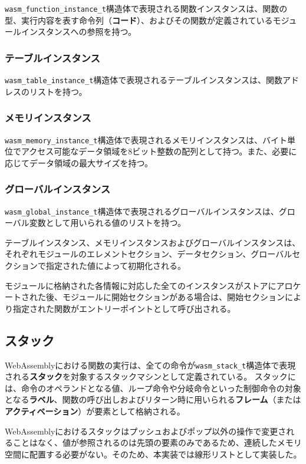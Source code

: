 \verb|wasm_function_instance_t|構造体で表現される関数インスタンスは、関数の型、実行内容を表す命令列（{\bf コード}）、およびその関数が定義されているモジュールインスタンスへの参照を持つ。

\subsubsection{テーブルインスタンス}

\verb|wasm_table_instance_t|構造体で表現されるテーブルインスタンスは、関数アドレスのリストを持つ。

\subsubsection{メモリインスタンス}

\verb|wasm_memory_instance_t|構造体で表現されるメモリインスタンスは、バイト単位でアクセス可能なデータ領域を8ビット整数の配列として持つ。また、必要に応じてデータ領域の最大サイズを持つ。

\subsubsection{グローバルインスタンス}

\verb|wasm_global_instance_t|構造体で表現されるグローバルインスタンスは、グローバル変数として用いられる値のリストを持つ。

テーブルインスタンス、メモリインスタンスおよびグローバルインスタンスは、それぞれモジュールのエレメントセクション、データセクション、グローバルセクションで指定された値によって初期化される。

モジュールに格納された各情報に対応した全てのインスタンスがストアにアロケートされた後、モジュールに開始セクションがある場合は、開始セクションにより指定された関数がエントリーポイントとして呼び出される。

\subsection{スタック}

WebAssemblyにおける関数の実行は、全ての命令が\verb|wasm_stack_t|構造体で表現される{\bf スタック}を対象するスタックマシンとして定義されている。
スタックには、命令のオペランドとなる値、ループ命令や分岐命令といった制御命令の対象となる{\bf ラベル}、関数の呼び出しおよびリターン時に用いられる{\bf フレーム}（または{\bf アクティベーション}）が要素として格納される。

WebAssemblyにおけるスタックはプッシュおよびポップ以外の操作で変更されることはなく、値が参照されるのは先頭の要素のみであるため、連続したメモリ空間に配置する必要がない。そのため、本実装では線形リストとして実装した。

